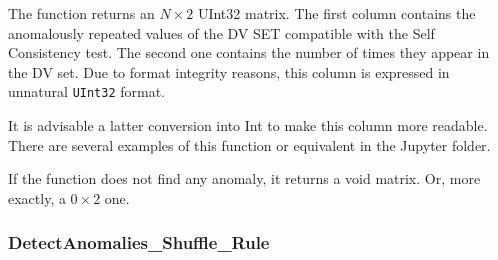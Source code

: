 \begin{itemize}
\begin{itemize}
	\end{itemize}
	
	The function returns an \(N\times 2\) UInt32 matrix. The first column contains the anomalously repeated values of the DV SET compatible with the Self Consistency test. The second one contains the number of times they appear in the DV set. Due to format integrity reasons, this column is expressed in unnatural \texttt{UInt32} format. 
	
	It is advisable a latter conversion into Int to make this column more readable. There are several examples of this function or equivalent in the Jupyter folder.
	
	If the function does not find any anomaly, it returns a void matrix.  Or, more exactly, a \(0\times 2\) one.
\end{itemize}
%
\subsubsection*{DetectAnomalies\_Shuffle\_Rule}\label{Fun:DetectAnomaliesShuffleRule}
